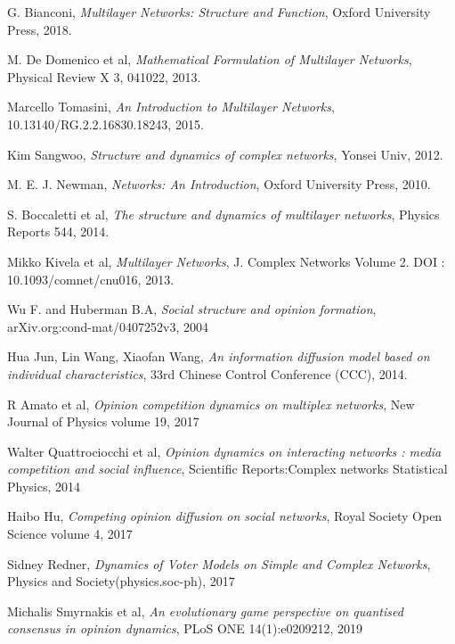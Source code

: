 \documentclass[english]{cccconf}
\begin{document}
\begin{thebibliography}{0}
G. Bianconi, \textit{Multilayer Networks: Structure and Function}, Oxford University Press, 2018.

M. De Domenico et al, \textit{Mathematical Formulation of Multilayer Networks}, Physical Review X 3, 041022, 2013.

Marcello Tomasini, \textit{An Introduction to Multilayer Networks}, 10.13140/RG.2.2.16830.18243, 2015.

Kim Sangwoo, \textit{Structure and dynamics of complex networks}, Yonsei Univ, 2012.

M. E. J. Newman, \textit{Networks: An Introduction}, Oxford University Press, 2010.
	
S. Boccaletti et al, \textit{The structure and dynamics of multilayer networks}, Physics Reports 544, 2014.	

Mikko Kivela et al, \textit{Multilayer Networks}, J. Complex Networks Volume 2. DOI : 10.1093/comnet/cnu016, 2013.	

Wu F. and Huberman B.A, \textit{Social structure and opinion formation}, arXiv.org:cond-mat/0407252v3, 2004	

Hua Jun, Lin Wang, Xiaofan Wang, \textit{An information diffusion model based on individual characteristics}, 33rd Chinese Control Conference (CCC), 2014.

R Amato et al, \textit{Opinion competition dynamics on multiplex networks}, New Journal of Physics volume 19, 2017

Walter Quattrociocchi et al, \textit{Opinion dynamics on interacting networks : media competition and social influence}, Scientific Reports:Complex networks Statistical Physics, 2014

Haibo Hu, \textit{Competing opinion diffusion on social networks}, Royal Society Open Science volume 4, 2017

Sidney Redner, \textit{Dynamics of Voter Models on Simple and Complex Networks}, Physics and Society(physics.soc-ph), 2017

Michalis Smyrnakis et al, \textit{An evolutionary game perspective on quantised consensus in opinion dynamics}, PLoS ONE 14(1):e0209212, 2019


\end{thebibliography}
\end{document}
